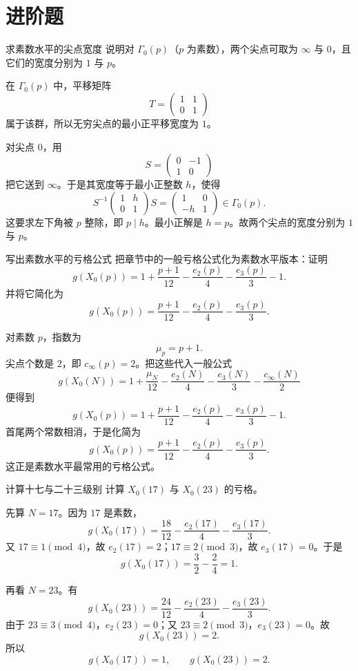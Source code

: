 \section{进阶题 \medium}

\begin{problem}{求素数水平的尖点宽度}
\medium
说明对 $\Gamma_0(p)$（$p$ 为素数），两个尖点可取为 $\infty$ 与 $0$，且它们的宽度分别为 $1$ 与 $p$。
\end{problem}
\begin{solution}
在 $\Gamma_0(p)$ 中，平移矩阵
\[
T=\begin{pmatrix}1&1\\0&1\end{pmatrix}
\]
属于该群，所以无穷尖点的最小正平移宽度为 $1$。

对尖点 $0$，用
\[
S=\begin{pmatrix}0&-1\\1&0\end{pmatrix}
\]
把它送到 $\infty$。于是其宽度等于最小正整数 $h$，使得
\[
S^{-1}\begin{pmatrix}1&h\\0&1\end{pmatrix}S=\begin{pmatrix}1&0\\-h&1\end{pmatrix}
\in\Gamma_0(p).
\]
这要求左下角被 $p$ 整除，即 $p\mid h$。最小正解是 $h=p$。故两个尖点的宽度分别为 $1$ 与 $p$。
\end{solution}

\begin{problem}{写出素数水平的亏格公式}
\medium
把章节中的一般亏格公式化为素数水平版本：证明
\[
g(X_0(p))=1+\frac{p+1}{12}-\frac{e_2(p)}{4}-\frac{e_3(p)}{3}-1.
\]
并将它简化为
\[
g(X_0(p))=\frac{p+1}{12}-\frac{e_2(p)}{4}-\frac{e_3(p)}{3}.
\]
\end{problem}
\begin{solution}
对素数 $p$，指数为
\[
\mu_p=p+1.
\]
尖点个数是 $2$，即 $c_\infty(p)=2$。把这些代入一般公式
\[
g(X_0(N))=1+\frac{\mu_N}{12}-\frac{e_2(N)}{4}-\frac{e_3(N)}{3}-\frac{c_\infty(N)}{2}
\]
便得到
\[
g(X_0(p))=1+\frac{p+1}{12}-\frac{e_2(p)}{4}-\frac{e_3(p)}{3}-1.
\]
首尾两个常数相消，于是化简为
\[
g(X_0(p))=\frac{p+1}{12}-\frac{e_2(p)}{4}-\frac{e_3(p)}{3}.
\]
这正是素数水平最常用的亏格公式。
\end{solution}

\begin{problem}{计算十七与二十三级别}
\medium
计算 $X_0(17)$ 与 $X_0(23)$ 的亏格。
\end{problem}
\begin{solution}
先算 $N=17$。因为 $17$ 是素数，
\[
g(X_0(17))=\frac{18}{12}-\frac{e_2(17)}{4}-\frac{e_3(17)}{3}.
\]
又 $17\equiv1\pmod4$，故 $e_2(17)=2$；$17\equiv2\pmod3$，故 $e_3(17)=0$。于是
\[
g(X_0(17))=\frac32-\frac24=1.
\]

再看 $N=23$。有
\[
g(X_0(23))=\frac{24}{12}-\frac{e_2(23)}{4}-\frac{e_3(23)}{3}.
\]
由于 $23\equiv3\pmod4$，$e_2(23)=0$；又 $23\equiv2\pmod3$，$e_3(23)=0$。故
\[
g(X_0(23))=2.
\]
所以
\[
g(X_0(17))=1,
\qquad
g(X_0(23))=2.
\]
\end{solution}


